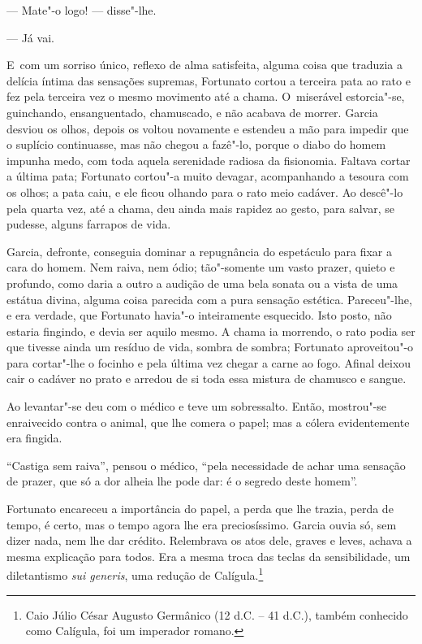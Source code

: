 \begin{linenumbers}
--- Mate"-o logo! --- disse"-lhe.

--- Já vai.

E~com um sorriso único, reflexo de alma satisfeita, alguma coisa que
traduzia a delícia íntima das sensações supremas, Fortunato cortou a
terceira pata ao rato e fez pela terceira vez o mesmo movimento até a
chama. O~miserável estorcia"-se, guinchando, ensanguentado, chamuscado, e
não acabava de morrer. Garcia desviou os olhos, depois os voltou
novamente e estendeu a mão para impedir que o suplício continuasse, mas
não chegou a fazê"-lo, porque o diabo do homem impunha medo, com toda
aquela serenidade radiosa da fisionomia. Faltava cortar a última pata;
Fortunato cortou"-a muito devagar, acompanhando a tesoura com os olhos; a
pata caiu, e ele ficou olhando para o rato meio cadáver. Ao descê"-lo
pela quarta vez, até a chama, deu ainda mais rapidez ao gesto, para
salvar, se pudesse, alguns farrapos de vida.

Garcia, defronte, conseguia dominar a repugnância do espetáculo para
fixar a cara do homem. Nem raiva, nem ódio; tão"-somente um vasto prazer,
quieto e profundo, como daria a outro a audição de uma bela sonata ou a
vista de uma estátua divina, alguma coisa parecida com a pura sensação
estética. Pareceu"-lhe, e era verdade, que Fortunato havia"-o inteiramente
esquecido. Isto posto, não estaria fingindo, e devia ser aquilo mesmo. A
chama ia morrendo, o rato podia ser que tivesse ainda um resíduo de
vida, sombra de sombra; Fortunato aproveitou"-o para cortar"-lhe o focinho
e pela última vez chegar a carne ao fogo. Afinal deixou cair o cadáver
no prato e arredou de si toda essa mistura de chamusco e sangue.

Ao levantar"-se deu com o médico e teve um sobressalto. Então, mostrou"-se
enraivecido contra o animal, que lhe comera o papel; mas a cólera
evidentemente era fingida.

``Castiga sem raiva'', pensou o médico, ``pela necessidade de achar uma
sensação de prazer, que só a dor alheia lhe pode dar: é o segredo deste
homem''.

Fortunato encareceu a importância do papel, a perda que lhe trazia,
perda de tempo, é certo, mas o tempo agora lhe era preciosíssimo. Garcia
ouvia só, sem dizer nada, nem lhe dar crédito. Relembrava os atos dele,
graves e leves, achava a mesma explicação para todos. Era a mesma troca
das teclas da sensibilidade, um diletantismo \emph{sui generis}, uma
redução de Calígula.\footnote{Caio Júlio César Augusto Germânico (12 d.C.
  -- 41 d.C.), também conhecido como Calígula, foi um imperador romano.}


\end{linenumbers}
